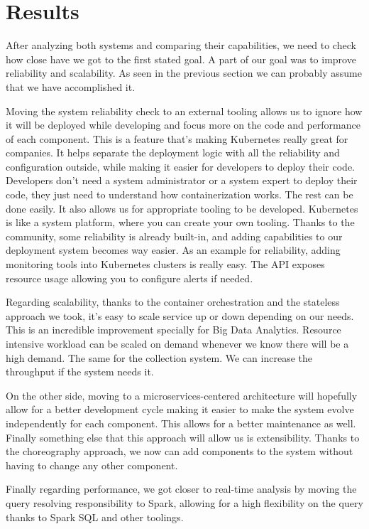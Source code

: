 
\chapter{Results} %

\label{Chapter5} %

After analyzing both systems and comparing their capabilities, we need to check how close have we got to the first stated goal. A part of our goal was to improve reliability and scalability. As seen in the previous section we can probably assume that we have accomplished it. 

Moving the system reliability check to an external tooling allows us to ignore how it will be deployed while developing and focus more on the code and performance of each component. This is a feature that’s making Kubernetes really great for companies. It helps separate the deployment logic with all the reliability and configuration outside, while making it easier for developers to deploy their code. Developers don’t need a system administrator or a system expert to deploy their code, they just need to understand how containerization works. The rest can be done easily. It also allows us for appropriate tooling to be developed. Kubernetes is like a system platform, where you can create your own tooling. Thanks to the community, some reliability is already built-in, and adding capabilities to our deployment system becomes way easier. As an example for reliability, adding monitoring tools into Kubernetes clusters is really easy. The API exposes resource usage allowing you to configure alerts if needed.

Regarding scalability, thanks to the container orchestration and the stateless approach we took, it’s easy to scale service up or down depending on our needs. This is an incredible improvement specially for Big Data Analytics. Resource intensive workload can be scaled on demand whenever we know there will be a high demand. The same for the collection system. We can increase the throughput if the system needs it. 

On the other side, moving to a microservices-centered architecture will hopefully allow for a better development cycle making it easier to make the system evolve independently for each component. This allows for a better maintenance as well. Finally something else that this approach will allow us is extensibility. Thanks to the choreography approach, we now can add components to the system without having to change any other component.

Finally regarding performance, we got closer to real-time analysis by moving the query resolving responsibility to Spark, allowing for a high flexibility on the query thanks to Spark SQL and other toolings.

